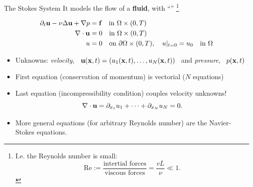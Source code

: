 \begin{frame}{The Stokes System}
  It models the flow of a \textit{}
  \textit{} \textbf{fluid}, with
  ``\textit{}''%
  \footnote{\scriptsize {I.e. the Reynolds number is small:
    $$
    \text{Re}:=\frac{\text{intertial forces}}{\text{viscous forces}}
    =\frac{vL}{\nu} \ll 1.
    $$
  }}
\begin{BlockNoTitle}
  \vspace{-1.2em}
  \begin{align*}
    \partial_t \mathbf{u} - \nu \Delta\mathbf{u} + \nabla p &= \mathbf{f} \quad\text{in }\Omega\times(0,T)
    \\
    \nabla\cdot{}\mathbf{u} &= 0 \quad\text{in }\Omega\times (0,T)
    \\
    u &= 0 \quad\text{on } \partial\Omega\times (0,T), \quad u|_{t=0} = u_0 \quad\text{in } \Omega
  \end{align*}
\end{BlockNoTitle}
\vspace{-0.5em}
\begin{small}
  \begin{itemize}
  \setlength{\itemsep}{-0.1em}
\item Unknowns: \emph{\alert{velocity}}, \
  $\mathbf{u}(\mathbf{x},t)=(u_1(\mathbf{x},t),\dots,u_N(\mathbf{x},t))$ \ and
  \emph{\alert{pressure}}, \ $p(\mathbf{x},t)$
  \item First equation (\alert{conservation of momentum}) is vectorial ($N$ equations)
  \item Last equation (\alert{incompressibility condition}) couples velocity unknowns!
    $$\nabla\cdot{}\mathbf{u} = \partial_{x_1}u_1+\cdots+\partial_{x_N}u_N=0.$$
  \item \scriptsize{More general equations (for arbitrary Reynolds
      number) are the \alert{Navier-Stokes} equations.}
  \end{itemize}
\end{small}
\end{frame}

